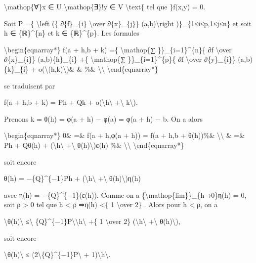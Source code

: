 \documentclass[]{article}
\begin{document}
\textbackslash{}mathop\{∀\}x ∈ U \textbackslash{}mathop\{∃\}!y ∈ V
\textbackslash{}text\{ tel que \}f(x,y) = 0.

Soit P =\{ \textbackslash{}left (\{ ∂\{f\}\_\{i\} \textbackslash{}over
∂\{x\}\_\{j\}\} (a,b)\textbackslash{}right )\}\_\{1≤i≤p,1≤j≤n\} et soit
h ∈ \{ℝ\}\^{}\{n\} et k ∈ \{ℝ\}\^{}\{p\}. Les formules

\textbackslash{}begin\{eqnarray*\} f(a + h,b + k) =\{
\textbackslash{}mathop\{∑ \}\}\_\{i=1\}\^{}\{n\}\{ ∂f
\textbackslash{}over ∂\{x\}\_\{i\}\} (a,b)\{h\}\_\{i\} +\{
\textbackslash{}mathop\{∑ \}\}\_\{i=1\}\^{}\{p\}\{ ∂f
\textbackslash{}over ∂\{y\}\_\{i\}\} (a,b)\{k\}\_\{i\} +
o(\textbackslash{}\textbar{}(h,k)\textbackslash{}\textbar{})\& \& \%\&
\textbackslash{}\textbackslash{} \textbackslash{}end\{eqnarray*\}

se traduisent par

f(a + h,b + k) = Ph + Qk +
o(\textbackslash{}\textbar{}h\textbackslash{}\textbar{}
+\textbackslash{}\textbar{} k\textbackslash{}\textbar{}).

Prenons k = θ(h) = φ(a + h) − φ(a) = φ(a + h) − b. On a alors

\textbackslash{}begin\{eqnarray*\} 0\& =\& f(a + h,φ(a + h)) = f(a + h,b
+ θ(h))\%\& \textbackslash{}\textbackslash{} \& =\& Ph + Qθ(h) +
(\textbackslash{}\textbar{}h\textbackslash{}\textbar{}
+\textbackslash{}\textbar{} θ(h)\textbackslash{}\textbar{})ε(h) \%\&
\textbackslash{}\textbackslash{} \textbackslash{}end\{eqnarray*\}

soit encore

θ(h) = −\{Q\}\^{}\{−1\}Ph +
(\textbackslash{}\textbar{}h\textbackslash{}\textbar{}
+\textbackslash{}\textbar{} θ(h)\textbackslash{}\textbar{})η(h)

avec η(h) = −\{Q\}\^{}\{−1\}(ε(h)). Comme on a
\{\textbackslash{}mathop\{lim\}\}\_\{h→0\}η(h) = 0, soit ρ
\textgreater{} 0 tel que h \textless{} ρ ⇒\textbar{}η(h)\textbar{}
\textless{}\{ 1 \textbackslash{}over 2\} . Alors pour h \textless{} ρ,
on a

\textbackslash{}\textbar{}θ(h)\textbackslash{}\textbar{}
≤\textbackslash{}\textbar{}
\{Q\}\^{}\{−1\}P\textbackslash{}\textbar{}\textbackslash{}\textbar{}h\textbackslash{}\textbar{}
+\{ 1 \textbackslash{}over 2\}
(\textbackslash{}\textbar{}h\textbackslash{}\textbar{}
+\textbackslash{}\textbar{} θ(h)\textbackslash{}\textbar{}),

soit encore

\textbackslash{}\textbar{}θ(h)\textbackslash{}\textbar{} ≤
(2\textbackslash{}\textbar{}\{Q\}\^{}\{−1\}P\textbackslash{}\textbar{} +
1)\textbackslash{}\textbar{}h\textbackslash{}\textbar{}.
\end{document}
